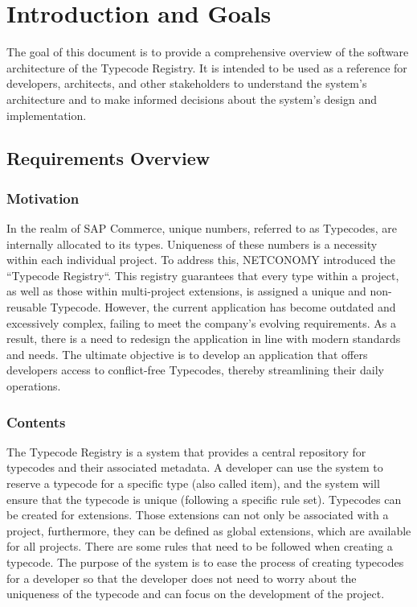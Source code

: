 \section{Introduction and Goals}\label{sec:introduction-and-goals}
The goal of this document is to provide a comprehensive overview of the software architecture of the Typecode Registry.
It is intended to be used as a reference for developers, architects, and other stakeholders to understand
the system's architecture and to make informed decisions about the system's design and implementation.


\subsection{Requirements Overview}\label{subsec:requirements-overview}
\subsubsection{Motivation}\label{subsubsec:motivation}
In the realm of SAP Commerce, unique numbers, referred to as Typecodes, are internally allocated to its types.
Uniqueness of these numbers is a necessity within each individual project.
To address this, NETCONOMY introduced the
``Typecode Registry``.
This registry guarantees that every type within a project, as well as those within multi-project
extensions, is assigned a unique and non-reusable Typecode.
However, the current application has become outdated
and excessively complex, failing to meet the company's evolving requirements.
As a result, there is a need to redesign
the application in line with modern standards and needs.
The ultimate objective is to develop an application that offers
developers access to conflict-free Typecodes, thereby streamlining their daily operations.

\subsubsection{Contents}\label{subsubsec:contents}
The Typecode Registry is a system that provides a central repository for typecodes and their associated metadata.
A developer can use the system to reserve a typecode for a specific type (also called item), and the system will ensure
that the typecode is unique (following a specific rule set).
Typecodes can be created for extensions.
Those extensions can not only be associated with a project,
furthermore, they can be defined as global extensions, which are available for all projects.
There are some rules that need to be followed when creating a typecode.
The purpose of the system is to ease the process
of creating typecodes for a developer so that the developer does not need to worry about the uniqueness of the typecode
and can focus on the development of the project.

